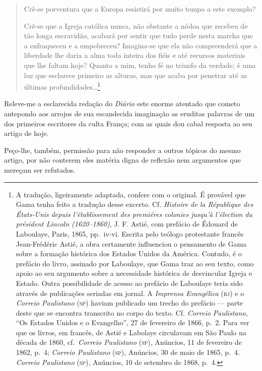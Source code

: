 \begin{quote}
Crê-se porventura que a Europa resistirá por muito tempo a este exemplo?

Crê-se que a Igreja católica nunca, não obstante a nódoa que recebeu de
tão longa escravidão, acabará por sentir que tudo perde nesta marcha que
a enfraqueceu e a empobreceu? Imagina-se que ela não compreenderá que a
liberdade lhe daria a alma toda inteira dos fiéis e até recursos
materiais que lhe faltam hoje? Quanto a mim, tenho fé no triunfo da
verdade; é uma luz que esclarece primeiro as alturas, mas que acaba por
penetrar até as últimas profundidades\ldots{}\footnote{A tradução,
  ligeiramente adaptada, confere com o original. É provável que Gama
  tenha feito a tradução desse excerto. Cf. \emph{Histoire de la
  République des États-Unis} \emph{depuis l'établissement des premiéres
  colonies jusqu'à l'élection du président Lincoln (1620--1860)}, J. F.
  Astié, com prefácio de Édouard de Laboulaye, Paris, 1865, pp.~iv-vi.
  Escrita pelo teólogo protestante francês Jean-Frédéric Astié, a obra
  certamente influenciou o pensamento de Gama sobre a formação histórica
  dos Estados Unidos da América. Contudo, é o prefácio do livro,
  assinado por Laboulaye, que Gama traz ao seu texto, como apoio ao seu
  argumento sobre a necessidade histórica de desvincular Igreja e
  Estado. Outra possibilidade de acesso ao prefácio de Laboulaye teria
  sido através de publicações seriadas em jornal. A \emph{Imprensa
  Evangélica} (\textsc{rj}) e o \emph{Correio Paulistano} (\textsc{sp}) haviam publicado
  um trecho do prefácio --- parte deste que se encontra transcrito no
  corpo do texto. Cf. \emph{Correio Paulistano}, ``Os Estados Unidos e o Evangelho'', 27 de fevereiro de 1866, p.~2. Para ver que os livros,
  em francês, de Astié e Labolaye circulavam em São Paulo na década de
  1860, cf.~\emph{Correio Paulistano} (\textsc{sp}), Anúncios, 11 de fevereiro de 1862, p.~4;
 \emph{Correio Paulistano} (\textsc{sp}), Anúncios, 30 de maio de 1865, p.~4.
  \emph{Correio Paulistano} (\textsc{sp}), Anúncios, 10 de setembro de 1868, p.~4.}
\end{quote}

Releve-me a esclarecida redação do \emph{Diário} este enorme atentado
que cometo antepondo aos arrojos de sua escandecida imaginação as
eruditas palavras de um dos primeiros escritores da culta França; com as
quais dou cabal resposta ao seu artigo de hoje.

Peço-lhe, também, permissão para não responder a outros tópicos do mesmo
artigo, por não conterem eles matéria digna de reflexão nem argumentos
que mereçam ser refutados.

